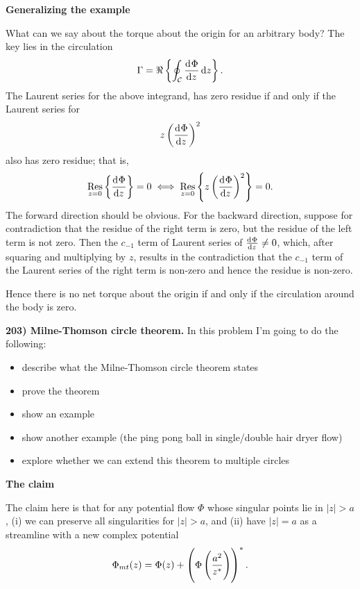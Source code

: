 \documentclass{article}
\DeclareMathOperator*{\res}{Res}
\newcommand{\fC}{\mathcal{C}} %
\begin{document}
\textbf{Generalizing the example}

What can we say about the torque about the origin for an arbitrary body?
The key lies in the circulation
%
\begin{equation*}
    \Gamma = \Re \cbr{\oint_\fC \dod{\Phi}{z} \dif z}
    .
\end{equation*}
%
The Laurent series for the above integrand, has zero residue if
and only if the Laurent series for
%
\begin{equation*}
    z \del{\dod{\Phi}{z}}^2
\end{equation*}
%
also has zero residue; that is,
%
\begin{equation*}
    \res_{z = 0} \cbr{\dod{\Phi}{z}} = 0 \iff
    \res_{z = 0} \cbr{z \del{\dod{\Phi}{z}}^2} = 0
    .
\end{equation*}
%
The forward direction should be obvious. For the backward direction,
suppose for contradiction that the residue of the right term is zero,
but the residue of the left term is not zero. Then the $c_{-1}$ term of
Laurent series of $\od{\Phi}{z} \neq 0$, which, after squaring and
multiplying by $z$, results in the contradiction that the $c_{-1}$ term
of the Laurent series of the right term is non-zero and hence the
residue is non-zero.

Hence there is no net torque about the origin if and only if the
circulation around the body is zero.

\newpage

\textbf{203) Milne-Thomson circle theorem.}
In this problem I'm going to do the following:
%
\begin{itemize}
    \item describe what the Milne-Thomson circle theorem states
    \item prove the theorem
    \item show an example
    \item show another example (the ping pong ball in single/double hair dryer flow)
    \item explore whether we can extend this theorem to multiple circles
\end{itemize}

\textbf{The claim}

The claim here is that for any potential flow $\Phi$ whose singular
points lie in $|z| > a$, (i) we can preserve all singularities for $|z|
> a$, and (ii) have $|z| = a$ as a streamline with a new complex
potential
%
\begin{equation*}
    \Phi_{mt}(z) = \Phi(z) + \del{\Phi \del{\frac{a^2}{z^*}}}^*
    .
\end{equation*}
\end{document}
